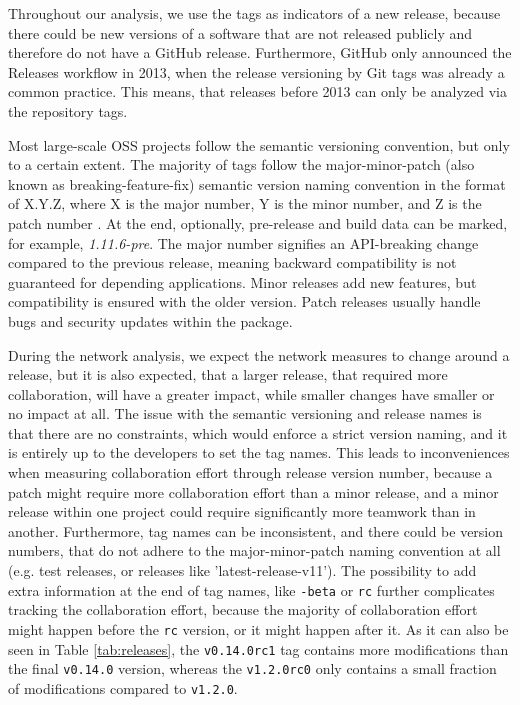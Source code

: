 Throughout our analysis, we use the tags as indicators of a new release, because there could be new versions of a software that are not released publicly and therefore do not have a GitHub release. Furthermore, GitHub only announced the Releases workflow in 2013, when the release versioning by Git tags was already a common practice. This means, that releases before 2013 can only be analyzed via the repository tags.

Most large-scale OSS projects follow the semantic versioning convention, but only to a certain extent. The majority of tags follow the major-minor-patch (also known as breaking-feature-fix) semantic version naming convention in the format of X.Y.Z, where X is the major number, Y is the minor number, and Z is the patch number \cite{preston-wernerSemanticVersioning}. At the end, optionally, pre-release and build data can be marked, for example, \textit{1.11.6-pre}. The major number signifies an API-breaking change compared to the previous release, meaning backward compatibility is not guaranteed for depending applications. Minor releases add new features, but compatibility is ensured with the older version. Patch releases usually handle bugs and security updates within the package.

During the network analysis, we expect the network measures to change around a release, but it is also expected, that a larger release, that required more collaboration, will have a greater impact, while smaller changes have smaller or no impact at all. The issue with the semantic versioning and release names is that there are no constraints, which would enforce a strict version naming, and it is entirely up to the developers to set the tag names. This leads to inconveniences when measuring collaboration effort through release version number, because a patch might require more collaboration effort than a minor release, and a minor release within one project could require significantly more teamwork than in another. Furthermore, tag names can be inconsistent, and there could be version numbers, that do not adhere to the major-minor-patch naming convention at all (e.g. test releases, or releases like 'latest-release-v11'). The possibility to add extra information at the end of tag names, like \texttt{-beta} or \texttt{rc} further complicates tracking the collaboration effort, because the majority of collaboration effort might happen before the \texttt{rc} version, or it might happen after it. As it can also be seen in Table \ref{tab:releases}, the \texttt{v0.14.0rc1} tag contains more modifications than the final \texttt{v0.14.0} version, whereas the \texttt{v1.2.0rc0} only contains a small fraction of modifications compared to \texttt{v1.2.0}.

